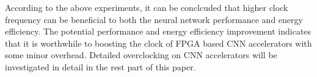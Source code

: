 According to the above experiments, it can be conclcuded that higher clock frequency 
can be beneficial to both the neural network performance and energy efficiency. The 
potential performance and energy efficiency improvement indicates that it is 
worthwhile to boosting the clock of FPGA based CNN accelerators with some minor 
overhead. Detailed overclocking on CNN accelerators will be investigated in 
detail in the rest part of this paper. 
